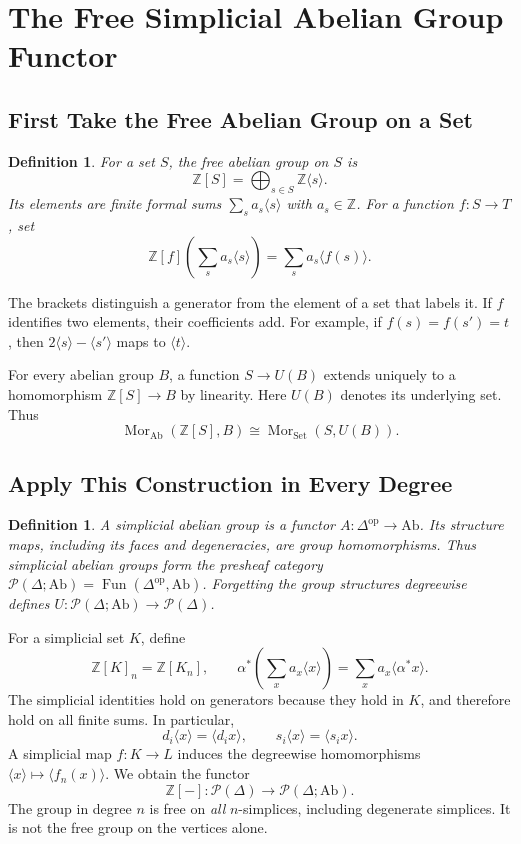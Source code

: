 \documentclass[11pt]{article}
\theoremstyle{linked}
\theoremstyle{plainlecture}
\newtheorem{definition}[proposition]{Definition}
\newcommand{\Z}{\mathbb Z}
\newcommand{\Mor}{\operatorname{Mor}}
\newcommand{\PSh}{\mathcal{P}}
\newcommand{\Fun}{\operatorname{Fun}}
\newcommand{\Set}{\mathrm{Set}}
\newcommand{\Ab}{\mathrm{Ab}}
\begin{document}
\section{The Free Simplicial Abelian Group Functor}
\subsection{First Take the Free Abelian Group on a Set}
\begin{definition}
For a set $S$, the free abelian group on $S$ is
\[
\Z[S]=\bigoplus_{s\in S}\Z\langle s\rangle.
\]
Its elements are finite formal sums $\sum_s a_s\langle s\rangle$ with $a_s\in\Z$. For a function $f:S\to T$, set
\[
\Z[f]\left(\sum_s a_s\langle s\rangle\right)
=\sum_s a_s\langle f(s)\rangle.
\]
\end{definition}
The brackets distinguish a generator from the element of a set that labels it. If $f$ identifies two elements, their coefficients add. For example, if $f(s)=f(s')=t$, then $2\langle s\rangle-\langle s'\rangle$ maps to $\langle t\rangle$.

For every abelian group $B$, a function $S\to U(B)$ extends uniquely to a homomorphism $\Z[S]\to B$ by linearity. Here $U(B)$ denotes its underlying set. Thus
\[
\Mor_\Ab(\Z[S],B)\cong\Mor_\Set(S,U(B)).
\]

\subsection{Apply This Construction in Every Degree}
\begin{definition}
A simplicial abelian group is a functor $A:\Delta^{\mathrm{op}}\to\Ab$. Its structure maps, including its faces and degeneracies, are group homomorphisms. Thus simplicial abelian groups form the presheaf category $\PSh(\Delta;\Ab)=\Fun(\Delta^{\mathrm{op}},\Ab)$. Forgetting the group structures degreewise defines $U:\PSh(\Delta;\Ab)\to\PSh(\Delta)$.
\end{definition}
For a simplicial set $K$, define
\[
\Z[K]_n=\Z[K_n],\qquad
\alpha^*\left(\sum_x a_x\langle x\rangle\right)
=\sum_x a_x\langle\alpha^*x\rangle.
\]
The simplicial identities hold on generators because they hold in $K$, and therefore hold on all finite sums. In particular,
\[
d_i\langle x\rangle=\langle d_ix\rangle,
\qquad s_i\langle x\rangle=\langle s_ix\rangle.
\]
A simplicial map $f:K\to L$ induces the degreewise homomorphisms
$\langle x\rangle\mapsto\langle f_n(x)\rangle$. We obtain the functor
\[
\Z[-]:\PSh(\Delta)\longrightarrow\PSh(\Delta;\Ab).
\]
The group in degree $n$ is free on \emph{all} $n$-simplices, including degenerate simplices. It is not the free group on the vertices alone.
\end{document}
